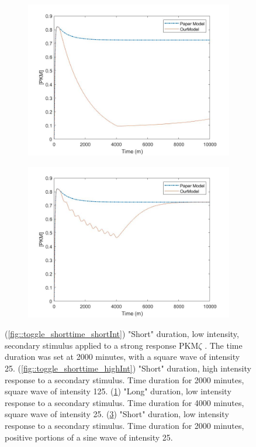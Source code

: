 \documentclass[12pt, a4paper]{article}
\newcommand{\PK}{PKM$\zeta$ }
\begin{document}
\begin{figure}[H]
    \begin{subfigure}[l]{0.5\textwidth}
        \centering
        \includegraphics[width = \textwidth]{pics/toggleSwitch_LongSquareWave.jpg}
        \caption{ }
        \label{fig::toggle_longtime_lowInt}
    \end{subfigure}
    \hspace*{-0.9em}
    \begin{subfigure}[r]{0.5\textwidth}
        \centering
        \includegraphics[width = \textwidth]{pics/toggleSwitch_sinpulse_ling.jpg}
        \caption{ }
        \label{fig::toggle_shortSin}
    \end{subfigure}
    \caption{(\ref{fig::toggle_shorttime_shortInt}) "Short" duration, low intensity, secondary stimulus applied to a strong response \PK. The time duration was set at 2000 minutes, with a square wave of intensity 25. (\ref{fig::toggle_shorttime_highInt}) "Short" duration, high intensity response to a secondary stimulus. Time duration for 2000 minutes, square wave of intensity 125. (\ref{fig::toggle_longtime_lowInt}) "Long" duration, low intensity response to a secondary stimulus. Time duration for 4000 minutes, square wave of intensity 25. (\ref{fig::toggle_shortSin}) "Short" duration, low intensity response to a secondary stimulus. Time duration for 2000 minutes, positive portions of a sine wave of intensity 25.}
\end{figure}
\end{document}
